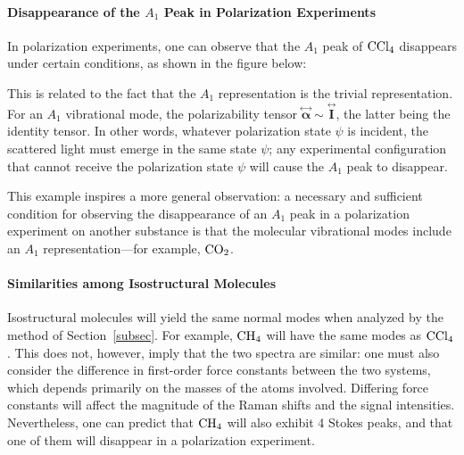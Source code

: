 \documentclass[lang=en, column=onecolumn, mathfont=times]{spArticle}
\begin{document}
\paragraph{Disappearance of the \texorpdfstring{$A_1$}{A₁} Peak in Polarization Experiments}

In polarization experiments, one can observe that the $A_1$ peak of $\ce{CCl4}$ disappears under certain conditions, as shown in the figure below:
\begin{figure}[H]
    \centering
    \resizebox{0.75\linewidth}{!}{}
\end{figure}
This is related to the fact that the $A_1$ representation is the trivial representation. For an $A_1$ vibrational mode, the polarizability tensor $\overset{\leftrightarrow}{\boldsymbol{\alpha }}\sim \overset{\leftrightarrow}{\boldsymbol{I}}$, the latter being the identity tensor. In other words, whatever polarization state $\psi$ is incident, the scattered light must emerge in the same state $\psi$; any experimental configuration that cannot receive the polarization state $\psi$ will cause the $A_1$ peak to disappear.

This example inspires a more general observation: a necessary and sufficient condition for observing the disappearance of an $A_1$ peak in a polarization experiment on another substance is that the molecular vibrational modes include an $A_1$ representation---for example, $\ce{CO2}$.

\paragraph{Similarities among Isostructural Molecules}

Isostructural molecules will yield the same normal modes when analyzed by the method of Section~\ref{subsec}. For example, $\ce{CH4}$ will have the same modes as $\ce{CCl4}$. This does not, however, imply that the two spectra are similar: one must also consider the difference in first-order force constants between the two systems, which depends primarily on the masses of the atoms involved. Differing force constants will affect the magnitude of the Raman shifts and the signal intensities. Nevertheless, one can predict that $\ce{CH4}$ will also exhibit 4 Stokes peaks, and that one of them will disappear in a polarization experiment.
\end{document}
